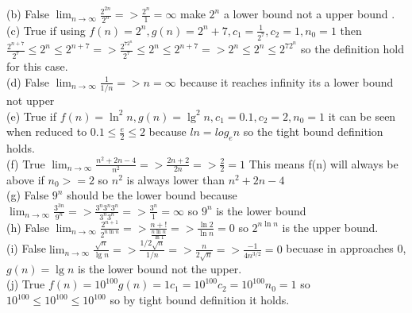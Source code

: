 \documentclass[12pt]{article}
\begin{document}
\begin{enumerate}
(b) False $\displaystyle{\lim_{n \to \infty}} \frac{2^{2n}}{2^n} => \frac{2^n}{1} = \infty$ make $2^n$ a lower bound not a upper bound .
\\
(c) True if using $f(n)=2^n , g(n)={2^n+7}, c_1 = \frac{1}{2^7} , c_2 = 1, n_0 = 1$ then$ \frac{2^{n+7}}{2^7} \leq  2^n\leq 2^{n+7}  => \frac{2^72^n}{2^7} \leq 2^n \leq 2^{n+7} => 2^n \leq 2^n \leq 2^72^{n} $ so the definition hold for this case.
\\
(d) False $\displaystyle{\lim_{n \to \infty}} \frac{1}{1/n} => n = \infty $ because it reaches infinity its a lower bound not upper
\\
(e) True if $  f(n) = \ln^2 n , g(n) = \lg^2 n , c_1 = 0.1 , c_2 = 2 , n_0 = 1$ it can be seen when reduced to $ 0.1 \leq  \frac{e}{2}\leq 2 $ because $ln = log_e n$ so the tight bound definition holds. 
\\
(f) True $\displaystyle{\lim_{n \to \infty}} \frac{n^2+2n-4}{n^2} => \frac{2n+2}{2n} => \frac{2}{2} = 1$ This means f(n) will always be above if $n_0 >= 2$ so $n^2$ is always lower than $n^2+2n-4$
\\
(g) False $9^n$ should be the lower bound because $\displaystyle{\lim_{n \to \infty}} \frac{3^{3n}}{9^n} => \frac{3^n3^n3^n}{3^n3^n} =>  \frac{3^n}{1} = \infty$ so $9^n$  is  the lower bound
\\
(h) False $\displaystyle{\lim_{n \to \infty}} \frac{2^{n+1}}{2^{n\ln n}} => \frac{n+!}{\frac{n\ln n}{\ln 1}} => \frac{\ln 2}{\ln n} =0$ so $2^{n\ln n}$ is the upper bound.
\\
(i) False$\displaystyle{\lim_{n \to \infty}} \frac{\sqrt{n}}{\lg n} => \frac{1/2\sqrt{n}}{1/n} => \frac{n}{2\sqrt{n}} =>\frac{-1}{4n^{3/2}} = 0 $ becuase in approaches 0, $g(n)= \lg n$ is the lower bound not the upper.
\\

(j) True $f(n) = 10^{100} g(n)=1 c_1 =10^{100} c_2 = 10^{100} n_0 = 1$ so $10^{100}\leq 10^{100} \leq 10^{100}$ so by tight bound definition it holds. 
    \pagebreak


\end{enumerate}
\end{document}
